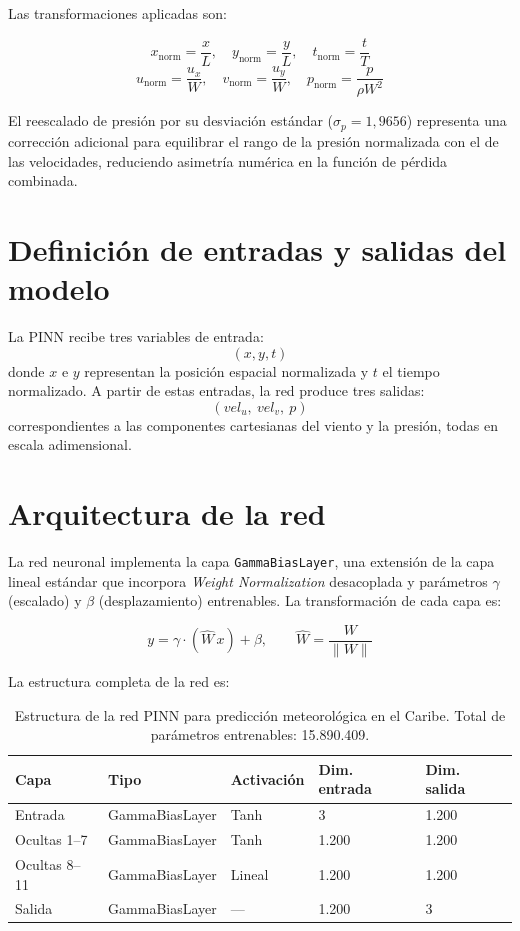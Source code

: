 Las transformaciones aplicadas son:

\[
x_{\text{norm}} = \frac{x}{L}, \quad y_{\text{norm}} = \frac{y}{L}, \quad t_{\text{norm}} = \frac{t}{T}
\]
\[
u_{\text{norm}} = \frac{u_x}{W}, \quad v_{\text{norm}} = \frac{u_y}{W}, \quad p_{\text{norm}} = \frac{p}{\rho W^2}
\]

El reescalado de presión por su desviación estándar ($\sigma_p = 1{,}9656$) representa una corrección adicional para equilibrar el rango de la presión normalizada con el de las velocidades, reduciendo asimetría numérica en la función de pérdida combinada.

\section{Definición de entradas y salidas del modelo}

La PINN recibe tres variables de entrada:
\[
(x, y, t)
\]
donde $x$ e $y$ representan la posición espacial normalizada y $t$ el tiempo normalizado. A partir de estas entradas, la red produce tres salidas:
\[
(vel_u,\ vel_v,\ p)
\]
correspondientes a las componentes cartesianas del viento y la presión, todas en escala adimensional.

\section{Arquitectura de la red}

La red neuronal implementa la capa \texttt{GammaBiasLayer}, una extensión de la capa lineal estándar que incorpora \textit{Weight Normalization} desacoplada y parámetros $\gamma$ (escalado) y $\beta$ (desplazamiento) entrenables. La transformación de cada capa es:

\[
y = \gamma \cdot \left(\hat{W}\,x\right) + \beta, \qquad \hat{W} = \frac{W}{\|W\|}
\]

La estructura completa de la red es:

\begin{table}[H]
\centering
\begin{tabular}{lllll}
\hline
Capa & Tipo & Activación & Dim. entrada & Dim. salida \\
\hline
Entrada & GammaBiasLayer & Tanh & 3 & 1.200 \\
Ocultas 1–7 & GammaBiasLayer & Tanh & 1.200 & 1.200 \\
Ocultas 8–11 & GammaBiasLayer & Lineal & 1.200 & 1.200 \\
Salida & GammaBiasLayer & — & 1.200 & 3 \\
\hline
\end{tabular}
\caption{Estructura de la red PINN para predicción meteorológica en el Caribe. Total de parámetros entrenables: 15.890.409.}
\label{tab:arquitectura_pinn}
\end{table}

